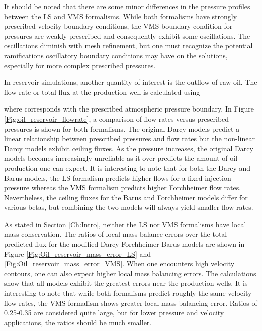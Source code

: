 \documentclass[11pt,reqno]{amsart}
\begin{document}
It should be noted that there are some minor differences in the pressure profiles 
between the LS and VMS formalisms. While both formalisms have strongly prescribed velocity 
boundary conditions, the VMS boundary condition for pressures are weakly prescribed and 
consequently exhibit some oscillations. The oscillations diminish with mesh refinement, 
but one must recognize the potential ramifications oscillatory boundary conditions 
may have on the solutions, especially for more complex prescribed pressures.

In reservoir simulations, another quantity of interest is the outflow of raw oil. The flow 
rate or total flux at the production well is calculated using

where  corresponds with the prescribed atmospheric pressure boundary. 
In Figure \ref{Fig:oil_reservoir_flowrate}, a comparison of flow rates versus prescribed
pressures is shown for both formalisms. The original Darcy models predict a linear relationship between 
prescribed pressures and flow rates but the non-linear Darcy models exhibit ceiling 
fluxes. As the pressure increases, the original Darcy models becomes increasingly 
unreliable as it over predicts the amount of oil production one can expect.  It is 
interesting to note that for both the Darcy and Barus models, the LS formalism predicts 
higher flows for a fixed injection pressure whereas the VMS formalism predicts higher Forchheimer 
flow rates. Nevertheless, the ceiling fluxes for the Barus and Forchheimer models differ for various 
betas, but combining the two models will always yield smaller flow rates.

As stated in Section \ref{Ch:Intro}, neither the LS nor VMS formalisms have local mass conservation. 
The ratios of local mass balance errors over the total predicted flux for the modified Darcy-Forchheimer 
Barus models are shown in Figure \ref{Fig:Oil_reservoir_mass_error_LS} and 
\ref{Fig:Oil_reservoir_mass_error_VMS}. When one encounters high velocity 
contours, one can also expect higher local mass balancing errors. The calculations 
show that all models exhibit the greatest errors near the production wells. It is 
interesting to note that while both formalisms predict roughly the same velocity flow rates, 
the VMS formalism shows greater local mass balancing error. Ratios of 0.25-0.35 are 
considered quite large, but for lower pressure and velocity applications, 
the ratios should be much smaller.
\end{document}
